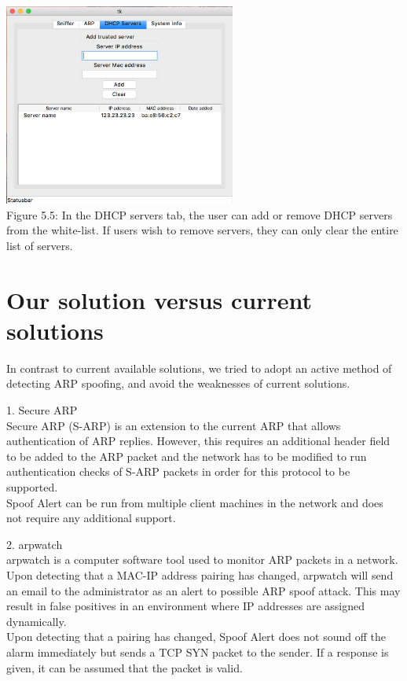 \documentclass{acm_proc_article-sp}
\begin{document}
\includegraphics[width=3in]{architecture05.png} \\
Figure 5.5: In the DHCP servers tab, the user can add or remove DHCP servers from the white-list. If users wish to remove servers, they can only clear the entire list of servers. 

\section{Our solution versus current \\solutions}
In contrast to current available solutions, we tried to adopt an active method of detecting ARP spoofing, and avoid the weaknesses of current solutions.  

1. Secure ARP\\
Secure ARP (S-ARP) is an extension to the current ARP that allows authentication of ARP replies. However, this requires an additional header field to be added to the ARP packet and the network has to be modified to run authentication checks of S-ARP packets in order for this protocol to be supported. \\
Spoof Alert can be run from multiple client machines in the network and does not require any additional support.

2. arpwatch \\
arpwatch is a computer software tool used to monitor ARP packets in a network. Upon detecting that a MAC-IP address pairing has changed, arpwatch will send an email to the administrator as an alert to possible ARP spoof attack. This may result in false positives in an environment where IP addresses are assigned dynamically. \\
Upon detecting that a pairing has changed, Spoof Alert does not sound off the alarm immediately but sends a TCP SYN packet to the sender. If a response is given, it can be assumed that the packet is valid.
\end{document}
